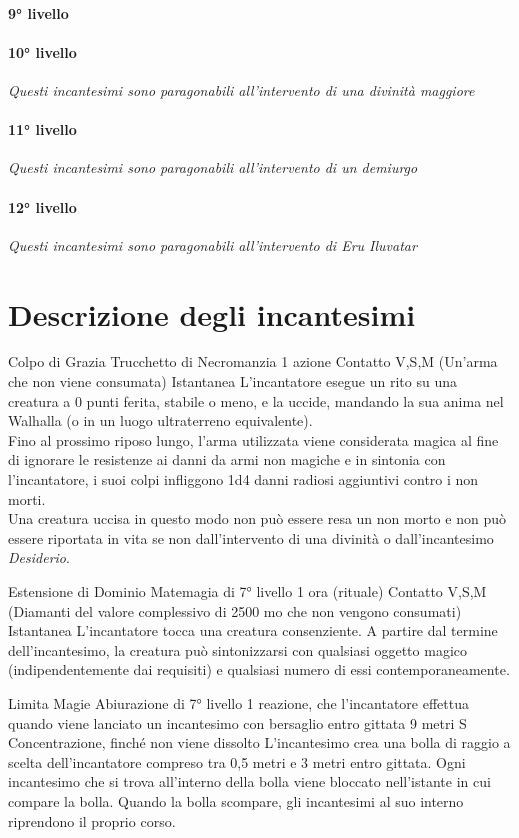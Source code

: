 \paragraph{9° livello}
\paragraph{10° livello} \textit{Questi incantesimi sono paragonabili all'intervento di una divinità maggiore}
\paragraph{11° livello} \textit{Questi incantesimi sono paragonabili all'intervento di un demiurgo}
\paragraph{12° livello} \textit{Questi incantesimi sono paragonabili all'intervento di Eru Iluvatar}

\section{Descrizione degli incantesimi}

\DndSpellHeader%
  {Colpo di Grazia}
  {Trucchetto di Necromanzia}
  {1 azione}
  {Contatto}
  {V,S,M (Un'arma che non viene consumata)}
  {Istantanea}
L'incantatore esegue un rito su una creatura a 0 punti ferita, stabile o meno, e la uccide, mandando la sua anima nel Walhalla (o in un luogo ultraterreno equivalente).\\ Fino al prossimo riposo lungo, l'arma utilizzata viene considerata magica al fine di ignorare le resistenze ai danni da armi non magiche e in sintonia con l'incantatore, i suoi colpi infliggono 1d4 danni radiosi aggiuntivi contro i non morti. \\ Una creatura uccisa in questo modo non può essere resa un non morto e non può essere riportata in vita se non dall'intervento di una divinità o dall'incantesimo \textit{Desiderio}.

\DndSpellHeader%
  {Estensione di Dominio}
  {Matemagia di 7° livello}
  {1 ora (rituale)}
  {Contatto}
  {V,S,M (Diamanti del valore complessivo di 2500 mo che non vengono consumati)}
  {Istantanea}
  L'incantatore tocca una creatura consenziente. A partire dal termine dell'incantesimo, la creatura può sintonizzarsi con qualsiasi oggetto magico (indipendentemente dai requisiti) e qualsiasi numero di essi contemporaneamente.

\DndSpellHeader%
  {Limita Magie}
  {Abiurazione di 7° livello}
  {1 reazione, che l'incantatore effettua quando viene lanciato un incantesimo con bersaglio entro gittata}
  {9 metri}
  {S}
  {Concentrazione, finché non viene dissolto}
L'incantesimo crea una bolla di raggio a scelta dell'incantatore compreso tra 0,5 metri e 3 metri entro gittata. Ogni incantesimo che si trova all'interno della bolla viene bloccato nell'istante in cui compare la bolla. Quando la bolla scompare, gli incantesimi al suo interno riprendono il proprio corso.

